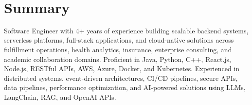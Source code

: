 \documentclass[letterpaper,10pt]{article}
\begin{document}
\begin{center}
   \\
  \vspace{1pt}
\end{center}
\vspace{-4pt}

\section{Summary}
\footnotesize{
Software Engineer with 4+ years of experience building scalable backend systems, serverless platforms, full-stack applications, and cloud-native solutions across fulfillment operations, health analytics, insurance, enterprise consulting, and academic collaboration domains. Proficient in Java, Python, C++, React.js, Node.js, RESTful APIs, AWS, Azure, Docker, and Kubernetes. Experienced in distributed systems, event-driven architectures, CI/CD pipelines, secure APIs, data pipelines, performance optimization, and AI-powered solutions using LLMs, LangChain, RAG, and OpenAI APIs.
}
\vspace{-1pt}
\end{document}
